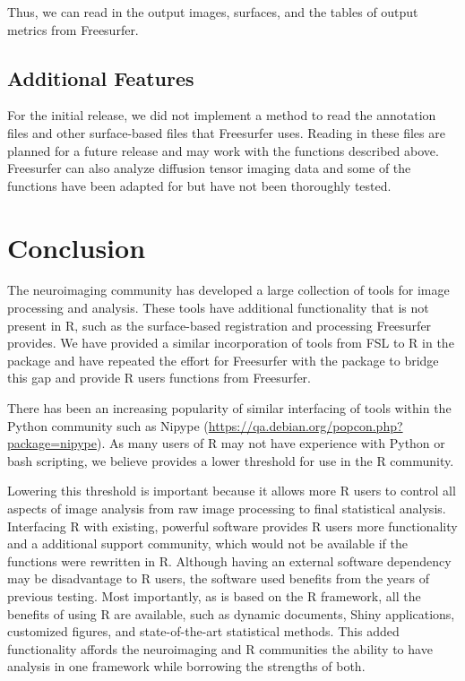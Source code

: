 Thus, we can read in the output images, surfaces, and the tables of
output metrics from Freesurfer.

\subsection{Additional Features}\label{additional-features}

For the initial release, we did not implement a method to read the
annotation files and other surface-based files that Freesurfer uses.
Reading in these files are planned for a future release and may work
with the functions described above. Freesurfer can also analyze
diffusion tensor imaging data and some of the functions have been
adapted for  but have not been thoroughly tested.

\section{Conclusion}\label{conclusion}

The neuroimaging community has developed a large collection of tools for
image processing and analysis. These tools have additional functionality
that is not present in R, such as the surface-based registration and
processing Freesurfer provides. We have provided a similar incorporation
of tools from FSL to R in the  package and have repeated the
effort for Freesurfer with the  package to bridge this
gap and provide R users functions from Freesurfer.

There has been an increasing popularity of similar interfacing of tools
within the Python community such as Nipype
\citep{gorgolewski_nipype:_2011}
(\url{https://qa.debian.org/popcon.php?package=nipype}). As many users
of R may not have experience with Python or bash scripting, we believe
 provides a lower threshold for use in the R community.

Lowering this threshold is important because it allows more R users to
control all aspects of image analysis from raw image processing to final
statistical analysis. Interfacing R with existing, powerful software
provides R users more functionality and a additional support community,
which would not be available if the functions were rewritten in R.
Although having an external software dependency may be disadvantage to R
users, the software used benefits from the years of previous testing.
Most importantly, as  is based on the R framework, all
the benefits of using R are available, such as dynamic documents, Shiny
applications, customized figures, and state-of-the-art statistical
methods. This added functionality affords the neuroimaging and R
communities the ability to have analysis in one framework while
borrowing the strengths of both.

